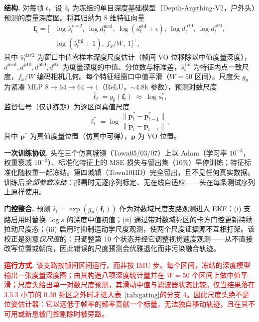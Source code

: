 \textbf{结构.} 对每帧 $t$，设 $\hat z_t$ 为冻结的单目深度基础模型（Depth-Anything-V2，户外头）预测的度量深度图。将其归纳为 8 维特征向量
\begin{align}
    \mathbf{f}_t = \big[&\log \hat s^{\,\mathrm{dav2}}_t,\ \log d^{\mathrm{med}}_t,\ \log (d^{\mathrm{std}}_t{+}\epsilon),\ \log d^{\mathrm{p10}}_t,\ \log d^{\mathrm{p90}}_t, \nonumber\\
    &\log (\hat s^{\,\mathrm{inl}}_t{+}1),\ f_x/W,\ 1\big]^{\top},
\end{align}
其中 $\hat s^{\,\mathrm{dav2}}_t$ 为窗口中值零样本深度尺度估计（帧间 VO 位移除以中值度量深度），$d^{\mathrm{med}}, d^{\mathrm{p10}}, d^{\mathrm{p90}}, d^{\mathrm{std}}$ 为度量深度的中值、分位数与标准差，$\hat s^{\,\mathrm{inl}}_t$ 为特征内点一致尺度，$f_x/W$ 编码相机几何。每个特征经窗口中值平滑（$W{=}50$ 区间）。尺度头 $g_\theta$ 为紧凑 MLP $8{\to}64{\to}64{\to}1$（ReLU，${\sim}4.8$k 参数），预测对数尺度
\begin{equation}
    \hat \ell_t = g_\theta(\mathbf{f}_t) \;\approx\; \log s^{*}_t,
\end{equation}
监督信号（仅训练期）为逐区间真值尺度
\begin{equation}
    \ell^{*}_t = \log \frac{\lVert \mathbf{p}^{*}_t - \mathbf{p}^{*}_{t-1} \rVert}{\lVert \mathbf{p}_t - \mathbf{p}_{t-1} \rVert},
\end{equation}
其中 $\mathbf{p}^{*}$ 为真值度量位置（仿真中可得），$\mathbf{p}$ 为 VO 位置。

\textbf{一次训练协议.} 头在三个仿真城镇（Town05/03/07）上以 Adam（学习率 $10^{-3}$，权重衰减 $10^{-3}$）、标准化特征上的 MSE 损失与留出集（$10\%$）早停训练；特征标准化随权重一起冻结。第四城镇（Town10HD）完全留出，且不见任何真实数据。训练后\emph{全部参数冻结}：部署时无逐序列标定、无在线自适应——头在每条测试序列上原样使用。

\textbf{门控整合.} 预测 $\hat s_t = \exp(g_\theta(\mathbf{f}_t))$ 作为对数域尺度支路观测进入 EKF：(i) 支路启用时替换 $\log s$ 的深度中值初值；(ii) 通过带对数域死区的卡方门控更新持续拉动尺度态；(iii) 启用时抑制运动学尺度观测，使两个尺度证据源不互相打架。该校正是刻意\emph{仅尺度}的：只调整第 10 个状态并经它调整视觉速度观测——从不直接改写位置或朝向，因此错误的尺度预测会优雅退化而非污染融合轨迹。

\textcolor{red}{\textbf{运行方式.} 该支路按帧间区间运行，而非按 IMU 步。每个区间，冻结的深度模型输出一张度量深度图；由其构造八项深度统计量并在 $W{=}50$ 个区间上做中值平滑；尺度头给出单一对数尺度预测，其滑动中值与滤波器状态比较。仅当结果落在 3.5.3 小节的 $0.30$ 死区之外时才进入表~\ref{tab:gating}的分支 4。因此尺度头绝不是位姿估计器：它以远低于帧率的频率贡献一个标量，无法独自移动轨迹，且在其不可用或新息被门控剔除时被旁路。}

